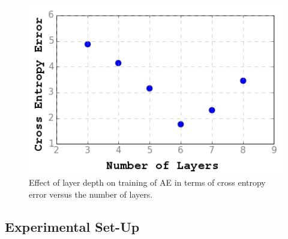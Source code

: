 \begin{figure}
\centering
\includegraphics[width=0.6\columnwidth]{Figures/layers}
\caption{Effect of layer depth on training of AE in terms of cross entropy error versus the number of layers.}
\label{fig:layerplot}
\end{figure}




\subsection{Experimental Set-Up}



